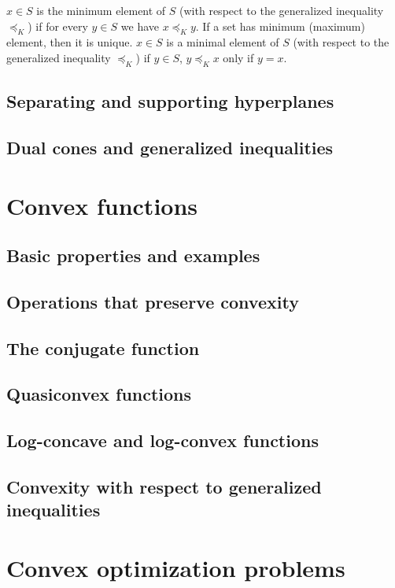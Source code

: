 \documentclass[11pt,oneside,a4paper]{book}
\theoremstyle{definition}
\DeclareRobustCommand{\[}{\begin{equation}}
\DeclareRobustCommand{\]}{\end{equation}}
\begin{document}
$ x\in S $ is the minimum element of $ S $ (with respect to the generalized inequality $ \preceq_K $) if for every $ y\in S $ we have $ x\preceq_K y $. If a set has minimum (maximum) element, then it is unique. $ x\in S $ is a minimal element of $ S $ (with respect to the generalized inequality $ \preceq_K $) if $ y\in S $, $ y\preceq_K x $ only if $ y=x $.

\section{Separating and supporting hyperplanes}

\section{Dual cones and generalized inequalities}

\chapter{Convex functions}

\section{Basic properties and examples}

\section{Operations that preserve convexity}

\section{The conjugate function}

\section{Quasiconvex functions}

\section{Log-concave and log-convex functions}

\section{Convexity with respect to generalized inequalities}

\chapter{Convex optimization problems}
\end{document}
